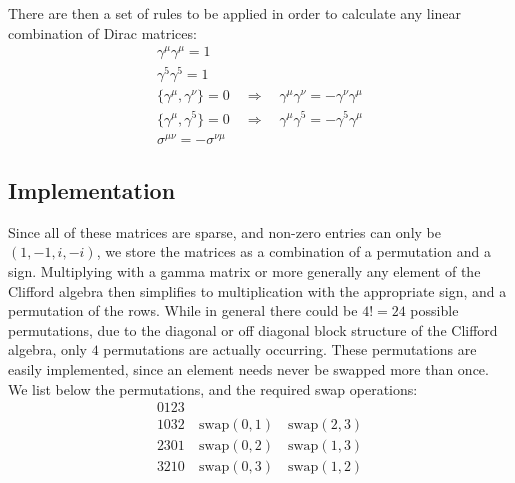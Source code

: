 \documentclass[a4paper,10pt]{article}
\begin{document}
There are then a set of rules to be applied in order to calculate any linear combination of Dirac matrices:
\begin{displaymath}
 \begin{array}{l}
 \gamma^{\mu}\gamma^{\mu}=1 \\
 \gamma^{5}\gamma^{5}=1 \\
 \{\gamma^{\mu},\gamma^{\nu}\}=0 \quad \Rightarrow \quad \gamma^{\mu}\gamma^{\nu}=-\gamma^{\nu}\gamma^{\mu} \\
 \{\gamma^{\mu},\gamma^{5}\}=0 \quad \Rightarrow \quad \gamma^{\mu}\gamma^{5}=-\gamma^{5}\gamma^{\mu} \\
 \sigma^{\mu\nu}=-\sigma^{\nu\mu}
\end{array}
\end{displaymath}
\subsection{Implementation}
Since all of these matrices are sparse, and non-zero entries can only be $(1, -1, i, -i)$, we store the matrices as a combination of a permutation and a sign. Multiplying with a gamma matrix or more generally any element of the Clifford algebra then simplifies to multiplication with the appropriate sign, and a permutation of the rows. While in general there could be $4!=24$ possible permutations, due to the diagonal or off diagonal block structure of the Clifford algebra, only $4$ permutations are actually occurring. These permutations are easily implemented, since an element needs never be swapped more than once. We list below the permutations, and the required swap operations:
\begin{displaymath}
 \begin{array}{l}
  0123 \\
  1032 \quad \textrm{swap}(0,1)\quad \textrm{swap}(2,3)\\
  2301 \quad \textrm{swap}(0,2)\quad \textrm{swap}(1,3)\\
  3210 \quad \textrm{swap}(0,3)\quad \textrm{swap}(1,2)
 \end{array}
\end{displaymath}
\end{document}
